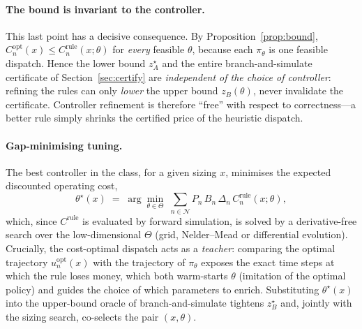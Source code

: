 \documentclass[11pt,a4paper]{article}
\theoremstyle{plain}
\theoremstyle{definition}
\begin{document}
\paragraph{The bound is invariant to the controller.} This last point has a decisive
consequence. By Proposition~\ref{prop:bound}, $C^{\mathrm{opt}}_n(x)\le
C^{\mathrm{rule}}_n(x;\theta)$ for \emph{every} feasible $\theta$, because each $\pi_\theta$
is one feasible dispatch. Hence the lower bound $z_A^\star$ and the entire
branch-and-simulate certificate of Section~\ref{sec:certify} are \emph{independent of the
choice of controller}: refining the rules can only \emph{lower} the upper bound
$z_B(\theta)$, never invalidate the certificate. Controller refinement is therefore
``free'' with respect to correctness---a better rule simply shrinks the certified price of
the heuristic dispatch.

\paragraph{Gap-minimising tuning.} The best controller in the class, for a given sizing
$x$, minimises the expected discounted operating cost,
\begin{equation}
  \theta^\star(x) \;=\; \arg\min_{\theta\in\Theta}\;
  \sum_{n\in\mathcal{N}} P_n\,B_n\,\Delta_n\,C^{\mathrm{rule}}_n(x;\theta),
  \label{eq:tune}
\end{equation}
which, since $C^{\mathrm{rule}}$ is evaluated by forward simulation, is solved by a
derivative-free search over the low-dimensional $\Theta$ (grid, Nelder--Mead or
differential evolution). Crucially, the cost-optimal dispatch acts as a \emph{teacher}:
comparing the optimal trajectory $u^{\mathrm{opt}}_n(x)$ with the trajectory of $\pi_\theta$
exposes the exact time steps at which the rule loses money, which both warm-starts $\theta$
(imitation of the optimal policy) and guides the choice of which parameters to enrich.
Substituting $\theta^\star(x)$ into the upper-bound oracle of branch-and-simulate tightens
$z_B^\star$ and, jointly with the sizing search, co-selects the pair $(x,\theta)$.
\end{document}
